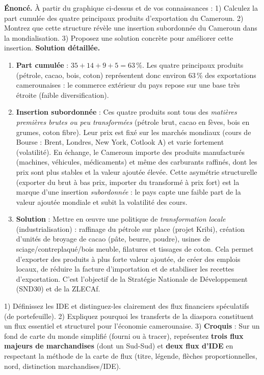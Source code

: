 \documentclass[11pt]{article}
\newcommand{\cle}[1]{{\popxbold\color{popdark}#1}}
\begin{document}
\begin{exoresolu}
\textbf{Énoncé.} À partir du graphique ci-dessus et de vos connaissances : 1) Calculez la part cumulée des quatre principaux produits d'exportation du Cameroun. 2) Montrez que cette structure révèle une insertion subordonnée du Cameroun dans la mondialisation. 3) Proposez une solution concrète pour améliorer cette insertion.
\tcblower
\textbf{Solution détaillée.}
\begin{enumerate}
\item \textbf{Part cumulée} : $35 + 14 + 9 + 5 = 63\,\%$. Les quatre principaux produits (pétrole, cacao, bois, coton) représentent donc environ 63\,\% des exportations camerounaises : le commerce extérieur du pays repose sur une base très étroite (faible diversification).
\item \textbf{Insertion subordonnée} : Ces quatre produits sont tous des \emph{matières premières brutes ou peu transformées} (pétrole brut, cacao en fèves, bois en grumes, coton fibre). Leur prix est fixé sur les marchés mondiaux (cours de Bourse : Brent, Londres, New York, Cotlook A) et varie fortement (volatilité). En échange, le Cameroun importe des produits manufacturés (machines, véhicules, médicaments) et même des carburants raffinés, dont les prix sont plus stables et la valeur ajoutée élevée. Cette asymétrie structurelle (exporter du brut à bas prix, importer du transformé à prix fort) est la marque d'une insertion \emph{subordonnée} : le pays capte une faible part de la valeur ajoutée mondiale et subit la volatilité des cours.
\item \textbf{Solution} : Mettre en œuvre une politique de \emph{transformation locale} (industrialisation) : raffinage du pétrole sur place (projet Kribi), création d'unités de broyage de cacao (pâte, beurre, poudre), usines de sciage/contreplaqué/bois meuble, filatures et tissages de coton. Cela permet d'exporter des produits à plus forte valeur ajoutée, de créer des emplois locaux, de réduire la facture d'importation et de stabiliser les recettes d'exportation. C'est l'objectif de la \cle{Stratégie Nationale de Développement (SND30)} et de la \cle{ZLECAf}.
\end{enumerate}
\end{exoresolu}

\begin{exercice}
1) Définissez les IDE et distinguez-les clairement des flux financiers spéculatifs (de portefeuille). 
2) Expliquez pourquoi les transferts de la diaspora constituent un flux essentiel et structurel pour l'économie camerounaise. 
3) \textbf{Croquis} : Sur un fond de carte du monde simplifié (fourni ou à tracer), représentez \textbf{trois flux majeurs de marchandises} (dont un Sud-Sud) et \textbf{deux flux d'IDE} en respectant la méthode de la carte de flux (titre, légende, flèches proportionnelles, nord, distinction marchandises/IDE).
\end{exercice}
\end{document}
